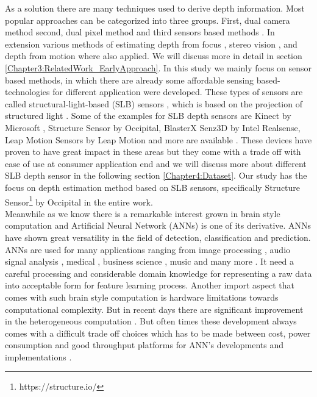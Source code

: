As a solution there are many techniques used to derive depth information. Most popular approaches can be categorized into three groups. First, dual camera method \cite{li2009dual} second,  dual pixel method \cite{martinello2015dual, choi2017all} and  third sensors based methods \cite{salvi2004pattern}. In extension various methods of estimating depth from focus \cite{grossmann1987depth}, stereo vision \cite{bulthoff1988integration}, and depth from motion \cite{ullman1979interpretation} where also applied. We will discuss more in detail in section \ref{Chapter3:RelatedWork_EarlyApproach}. In this study we mainly focus on sensor based methods, in which there are already some affordable sensing based-technologies for different application were developed. These types of sensors are called structural-light-based (SLB)  sensors \cite{salvi2004pattern}, which is based on the projection of structured light \cite{zhang2012microsoft}. Some of the examples for SLB depth sensors are Kinect by Microsoft , Structure Sensor by Occipital, BlasterX Senz3D by Intel Realsense, Leap Motion Sensors by Leap Motion \cite{marin2014hand} and more are available \cite{mal2018sparse}. These devices have proven to have great impact in these areas but they come with a trade off with ease of use at consumer application end and we will discuss more about different SLB depth sensor in the following section \ref{Chapter4:Dataset}. Our study has the focus on depth estimation method based on SLB sensors, specifically Structure Sensor\footnote{https://structure.io/} by Occipital in the entire work.\\

Meanwhile as we know there is a remarkable interest grown in brain style computation and Artificial Neural Network (ANNs) is one of its derivative. ANNs have shown great versatility in the field of detection, classification and prediction. ANNs are used for many applications ranging from image processing \cite{guyon1991applications} , audio signal analysis \cite{bourlard1993continuous}, medical \cite{baxt1990use}, business science \cite{widrow1994neural}, music \cite{nadar2019towards} and many more \cite{zhang2000neural}. It  need a careful processing and considerable domain knowledge for representing a raw data into acceptable form for feature learning process. Another import aspect that comes with such brain style computation is hardware limitations towards computational complexity. But in recent days there are significant improvement in the heterogeneous computation \cite{mittal2015survey}. But often times these development always comes with a difficult trade off choices which has to be made between cost, power consumption and good throughput platforms for ANN's developments and implementations \cite{mittal2019survey}. \\




